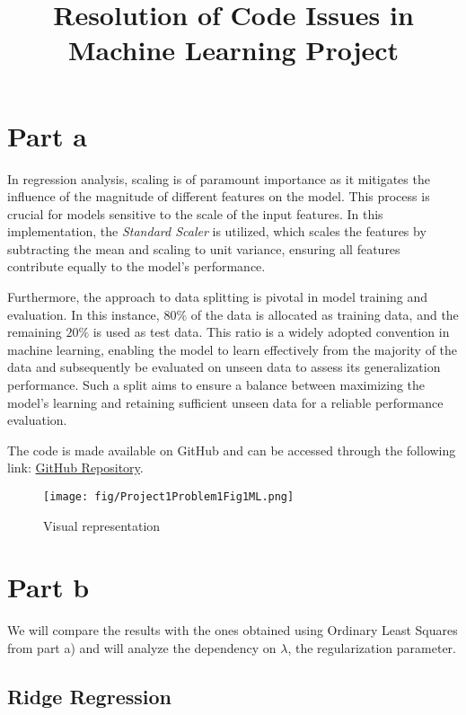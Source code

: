 \documentclass{article}
\begin{document}
\title{Resolution of Code Issues in Machine Learning Project}
\author{}
\date{}
\maketitle

\section*{Part a}

In regression analysis, scaling is of paramount importance as it mitigates the influence of the magnitude of different features on the model. This process is crucial for models sensitive to the scale of the input features. In this implementation, the \textit{Standard Scaler} is utilized, which scales the features by subtracting the mean and scaling to unit variance, ensuring all features contribute equally to the model's performance.

Furthermore, the approach to data splitting is pivotal in model training and evaluation. In this instance, $80\%$ of the data is allocated as training data, and the remaining $20\%$ is used as test data. This ratio is a widely adopted convention in machine learning, enabling the model to learn effectively from the majority of the data and subsequently be evaluated on unseen data to assess its generalization performance. Such a split aims to ensure a balance between maximizing the model's learning and retaining sufficient unseen data for a reliable performance evaluation.

The code is made available on GitHub and can be accessed through the following link: \href{https://github.com/SheikAbdullahi/MachineLearning}{GitHub Repository}.

\begin{figure}[htbp]
    \centering
    \texttt{[image: fig/Project1Problem1Fig1ML.png]}
    \caption{Visual representation}
    \label{fig:python-code}
\end{figure}


\section*{Part b}


We will compare the results with the ones obtained using Ordinary Least Squares from part a) and will analyze the dependency on \( \lambda \), the regularization parameter.

\subsection*{Ridge Regression}
\end{document}
